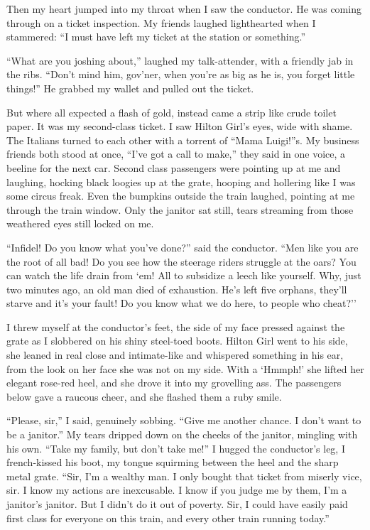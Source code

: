 \documentclass[oneside]{book}
\begin{document}
Then my heart jumped into my throat when I saw the conductor.  He was coming through on a ticket inspection.
My friends laughed lighthearted when I stammered:  ``I must have left my ticket
at the station or something.''

``What are you joshing about,'' laughed my talk-attender, with a friendly jab in the ribs.  ``Don't mind him,
gov'ner, when you're as big as he is, you forget little things!''  He grabbed my wallet
and pulled out the ticket.

But where all expected a flash of gold, instead came a strip like crude toilet paper.  It was my second-class
ticket.  I saw Hilton Girl's eyes, wide with shame.  The Italians turned to each other with a torrent of
``Mama Luigi!''s.  My business friends both stood at once, ``I've got a call to make,'' they said in one voice,
a beeline for the next car.  Second class passengers were pointing up at me and laughing, hocking
black loogies up at the grate, hooping and hollering like I was some circus freak.  Even the bumpkins outside
the train laughed, pointing at me through the train window.  Only the janitor
sat still, tears streaming from those weathered eyes still locked on me.

``Infidel!  Do you know what you've done?'' said the conductor.  ``Men like you are the root of all bad!
Do you see how the steerage riders struggle at the oars?  You can watch the life drain
from `em!  All to subsidize a leech like yourself.  Why, just two minutes ago, an
old man died of exhaustion.  He's left five orphans, they'll
starve and it's your fault!  Do you know what we do here, to people who cheat?''

I threw myself at the conductor's feet, the side of my face pressed against the grate as I slobbered on his shiny
steel-toed boots.  Hilton Girl went to his side, she leaned in real close and intimate-like and whispered
something in his ear, from the look on her face she was not on my side.  With a `Hmmph!' she
lifted her elegant rose-red heel, and she drove it into my grovelling ass.  The passengers below gave a raucous
cheer, and she flashed them a ruby smile.

``Please, sir,'' I said, genuinely sobbing.  ``Give me another chance.  I don't want to be a janitor.''  My tears dripped
down on the cheeks of the janitor, mingling with his own.  ``Take my family,
but don't take me!''  I hugged the conductor's leg, I french-kissed his boot, my tongue squirming between the heel and the sharp
metal grate.  ``Sir, I'm a wealthy man.  I only bought that ticket from miserly vice, sir.  I know my actions are
inexcusable.  I know if you judge me by them, I'm a janitor's janitor.  But I didn't do it out of poverty.
Sir, I could have easily paid first class for everyone on this train, and every other train running today.''
\end{document}
